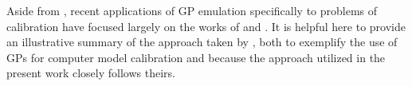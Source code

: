 \documentclass{article}
\begin{document}



Aside from \cite{Kennedy2001}, recent applications of GP emulation specifically to problems of calibration have focused largely on the works of \cite{Williams2006} and \cite{Bayarri2007}. It is helpful here to provide an illustrative summary of the approach taken by \cite{Williams2006}, both to exemplify the use of GPs for computer model calibration and because the approach utilized in the present work closely follows theirs.
\end{document}
